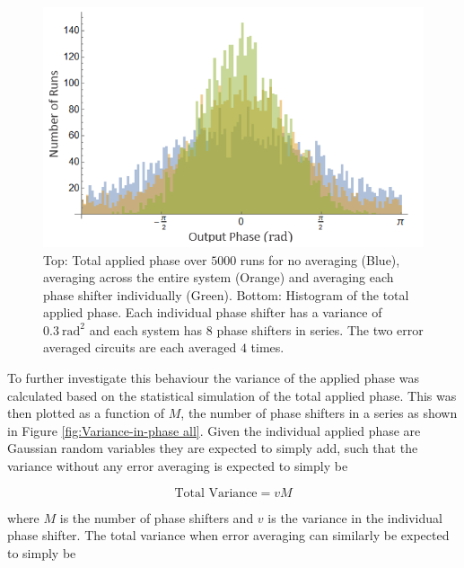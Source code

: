 \documentclass[aps,pra,twocolumn,superscriptaddress,numerical]{revtex4-1}
\begin{document}
		
		\begin{figure}
			\begin{centering}
				\includegraphics[width=\columnwidth]{totPhase2.png}
				\par\end{centering}
			
			\caption[Statistical simulation of total applied phase for no correction, correcting across the system and correcting each element individually for a smaller system. ]{Top: Total applied phase over $5000$ runs for no averaging (Blue), averaging across the entire system (Orange) and averaging each phase shifter individually (Green). Bottom: Histogram of the total applied phase. Each individual phase shifter has a variance of $0.3\ \textrm{rad}^{2}$ and each system has $8$ phase shifters in series. The two error averaged circuits are each averaged $4$ times. \label{fig:Total-applied-phase2}}
		\end{figure}
		
		
		To further investigate this behaviour the variance of the applied phase was calculated based on the statistical simulation of the total applied phase. This was then plotted as a function of $M$, the number of phase shifters in a series as shown in Figure \ref{fig:Variance-in-phase all}. Given the individual applied phase are Gaussian random variables they are expected to simply add, such that the variance without any error averaging is expected to simply be
		
		\begin{equation}
		\textrm{Total Variance}=vM\label{eq:Tot Var no correction}
		\end{equation}
		
		
		where $M$ is the number of phase shifters and $v$ is the variance in the individual phase shifter. The total variance when error averaging can similarly be expected to simply be
		
\end{document}
